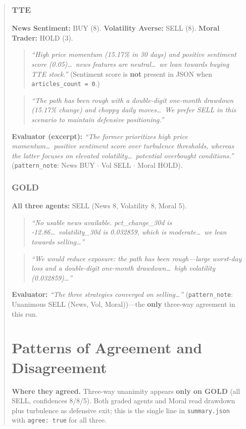 \documentclass[11pt]{article}
\begin{document}
\begin{abstract}
\subsubsection*{TTE}
\textbf{News Sentiment:} BUY (8). \textbf{Volatility Averse:} SELL (8). \textbf{Moral Trader:} HOLD (3).
\begin{quote}\small
\emph{``High price momentum (15.17\% in 30 days) and positive sentiment score (0.05)\ldots\ news features are neutral\ldots\ we lean towards buying TTE stock.''} (Sentiment score is \textbf{not} present in JSON when \texttt{articles\_count = 0}.)
\end{quote}
\begin{quote}\small
\emph{``The path has been rough with a double-digit one-month drawdown (15.17\% change) and choppy daily moves\ldots\ We prefer SELL in this scenario to maintain defensive positioning.''}
\end{quote}
\textbf{Evaluator (excerpt):} \emph{``The former prioritizes high price momentum\ldots\ positive sentiment score over turbulence thresholds, whereas the latter focuses on elevated volatility\ldots\ potential overbought conditions.''} (\texttt{pattern\_note}: News BUY $\cdot$ Vol SELL $\cdot$ Moral HOLD).

\subsubsection*{GOLD}
\textbf{All three agents:} SELL (News 8, Volatility 8, Moral 5).
\begin{quote}\small
\emph{``No usable news available. pct\_change\_30d is -12.86\ldots\ volatility\_30d is 0.032859, which is moderate\ldots\ we lean towards selling\ldots''}
\end{quote}
\begin{quote}\small
\emph{``We would reduce exposure: the path has been rough---large worst-day loss and a double-digit one-month drawdown\ldots\ high volatility (0.032859)\ldots''}
\end{quote}
\textbf{Evaluator:} \emph{``The three strategies converged on selling\ldots''} (\texttt{pattern\_note}: Unanimous SELL (News, Vol, Moral))---the \textbf{only} three-way agreement in this run.


\section{Patterns of Agreement and Disagreement}

\textbf{Where they agreed.} Three-way unanimity appears \textbf{only on GOLD} (all SELL, confidences 8/8/5). Both graded agents and Moral read drawdown plus turbulence as defensive exit; this is the single line in \texttt{summary.json} with \texttt{agree: true} for all three.


\end{abstract}
\end{document}
